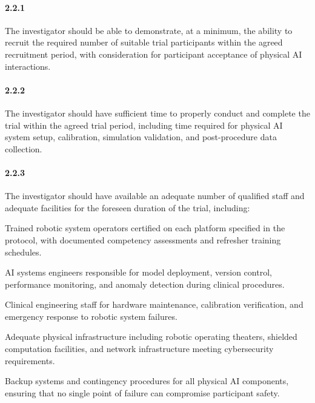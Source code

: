\documentclass[11pt]{article}
\begin{document}
\paragraph{2.2.1} The investigator should be able to demonstrate, at a minimum, the ability to recruit the required number of suitable trial participants within the agreed recruitment period, with consideration for participant acceptance of physical AI interactions.

\paragraph{2.2.2} The investigator should have sufficient time to properly conduct and complete the trial within the agreed trial period, including time required for physical AI system setup, calibration, simulation validation, and post-procedure data collection.

\paragraph{2.2.3} The investigator should have available an adequate number of qualified staff and adequate facilities for the foreseen duration of the trial, including:

\begin{description}[leftmargin=2.5cm,style=sameline]

\item[(a)] Trained robotic system operators certified on each platform specified in the protocol, with documented competency assessments and refresher training schedules.

\item[(b)] AI systems engineers responsible for model deployment, version control, performance monitoring, and anomaly detection during clinical procedures.

\item[(c)] Clinical engineering staff for hardware maintenance, calibration verification, and emergency response to robotic system failures.

\item[(d)] Adequate physical infrastructure including robotic operating theaters, shielded computation facilities, and network infrastructure meeting cybersecurity requirements.

\item[(e)] Backup systems and contingency procedures for all physical AI components, ensuring that no single point of failure can compromise participant safety.

\end{description}
\end{document}

